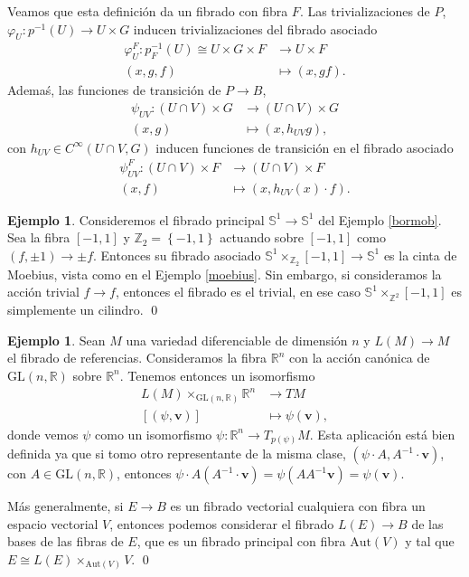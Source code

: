 \documentclass[12pt,a4paper]{article}
\theoremstyle{definition} \newtheorem{defn}[thm]{Definición}
\theoremstyle{definition} \newtheorem{ejemplo}[thm]{Ejemplo}
\theoremstyle{definition} \newtheorem{ejercicio}[thm]{Ejercicio}
\theoremstyle{remark} \newtheorem*{obs}{Observación}
\def\ZZ{\mathbb{Z}}
\def\RR{\mathbb{R}}
\def\SF{\mathbb{S}}
\newcommand{\ve}[1]{\mathbf{#1}}
\begin{document}
Veamos que esta definición da un fibrado con fibra $F$. Las trivializaciones de $P$, $\varphi_U:p^{-1}(U) \rightarrow U\times G$ inducen trivializaciones del fibrado asociado
\begin{align*}
  \varphi_U^F :p_F^{-1}(U)\cong U\times G \times F&\longrightarrow U\times F\\ 
  (x,g,f) &\longmapsto (x,gf) .
  \end{align*}
  Ademaś, las funciones de transición de $P\rightarrow B$,
  \begin{align*}
    \psi_{UV} :(U\cap V) \times G&\longrightarrow (U\cap V) \times G\\ 
    (x,g) &\longmapsto (x,h_{UV}g), 
    \end{align*}
    con $h_{UV}\in C^{\infty}(U\cap V,G)$ inducen funciones de transición en el fibrado asociado
    \begin{align*}
      \psi_{UV}^F :(U\cap V)\times F&\longrightarrow (U\cap V)\times F\\ 
      (x,f) &\longmapsto (x,h_{UV}(x)\cdot f). 
      \end{align*}

      \begin{ejemplo}
	Consideremos el fibrado principal $\SF^1 \rightarrow \SF^1$ del Ejemplo \ref{bormob}. Sea la fibra $[-1,1]$ y $\ZZ_2=\left\{ -1,1 \right\}$ actuando sobre $[-1,1]$ como $(f,\pm 1) \rightarrow \pm f$. Entonces su fibrado asociado $\SF^1\times_{\ZZ_2} [-1,1]\rightarrow \SF^1$ es la cinta de Moebius, vista como en el Ejemplo \ref{moebius}. Sin embargo, si consideramos la acción trivial $f\rightarrow f$, entonces el fibrado es el trivial, en ese caso $\SF^1\times_{\ZZ^2}[-1,1]$ es simplemente un cilindro.
	\qed
      \end{ejemplo}

      \begin{ejemplo}
	Sean $M$ una variedad diferenciable de dimensión $n$ y $L(M)\rightarrow M$ el fibrado de referencias. Consideramos la fibra $\RR^n$ con la acción canónica de $\mathrm{GL}(n,\RR)$ sobre $\RR^n$. Tenemos entonces un isomorfismo
	\begin{align*}
	  L(M)\times_{\mathrm{GL}(n,\RR)} \RR^n&\longrightarrow TM\\ 
	   [(\psi, \ve{v})] &\longmapsto \psi(\ve{v}), 
	  \end{align*}
	  donde vemos $\psi$ como un isomorfismo $\psi:\RR^n \rightarrow T_{p(\psi)}M$. Esta aplicación está bien definida ya que si tomo otro representante de la misma clase, $(\psi \cdot A, A^{-1} \cdot \ve{v})$, con $A\in \mathrm{GL}(n,\RR)$, entonces $\psi\cdot A (A^{-1} \cdot \ve{v})= \psi(A A^{-1} \ve{v})=\psi(\ve{v})$. 

	  Más generalmente, si $E\rightarrow B$ es un fibrado vectorial cualquiera con fibra un espacio vectorial $V$, entonces podemos considerar el fibrado $L(E)\rightarrow B$ de las bases de las fibras de $E$, que es un fibrado principal con fibra $\mathrm{Aut}(V)$ y tal que $E\cong L(E)\times_{\mathrm{Aut}(V)} V$.
	  \qed
      \end{ejemplo}
\end{document}
